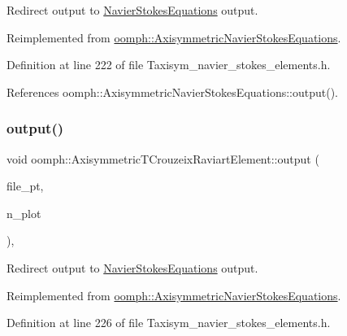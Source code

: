 Redirect output to \hyperlink{classoomph_1_1NavierStokesEquations}{Navier\+Stokes\+Equations} output. 



Reimplemented from \hyperlink{classoomph_1_1AxisymmetricNavierStokesEquations_a61129dd7505ac363862946bd8b3ea5bf}{oomph\+::\+Axisymmetric\+Navier\+Stokes\+Equations}.



Definition at line 222 of file Taxisym\+\_\+navier\+\_\+stokes\+\_\+elements.\+h.



References oomph\+::\+Axisymmetric\+Navier\+Stokes\+Equations\+::output().

\mbox{\label{classoomph_1_1AxisymmetricTCrouzeixRaviartElement_aeec639f7ae884f7dd7f1d33ad63ba0b2}} 
\subsubsection{\texorpdfstring{output()}{output()}\hspace{0.1cm}{\footnotesize\ttfamily [4/4]}}
{\footnotesize\ttfamily void oomph\+::\+Axisymmetric\+T\+Crouzeix\+Raviart\+Element\+::output (\begin{DoxyParamCaption}\item[{F\+I\+LE $\ast$}]{file\+\_\+pt,  }\item[{const unsigned \&}]{n\+\_\+plot }\end{DoxyParamCaption})\hspace{0.3cm}{\ttfamily [inline]}, {\ttfamily [virtual]}}



Redirect output to \hyperlink{classoomph_1_1NavierStokesEquations}{Navier\+Stokes\+Equations} output. 



Reimplemented from \hyperlink{classoomph_1_1AxisymmetricNavierStokesEquations_abc2ca00250845e243da3f4e0845b2c96}{oomph\+::\+Axisymmetric\+Navier\+Stokes\+Equations}.



Definition at line 226 of file Taxisym\+\_\+navier\+\_\+stokes\+\_\+elements.\+h.



